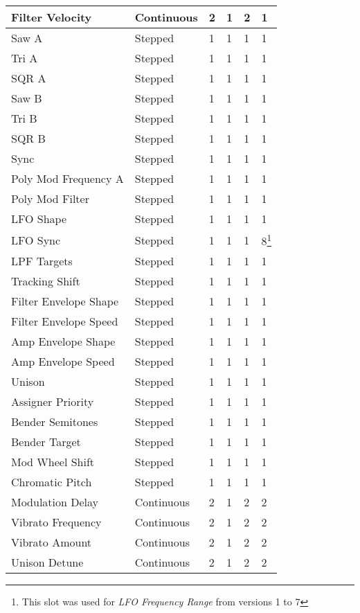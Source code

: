 \begin{longtable}[l]{|p{5cm}|p{2cm}|p{1.5cm}|p{1.5cm}|p{1.5cm}|p{1.5cm}|}
Filter Velocity & Continuous & 2 & 1 & 2 & 1 \\ \hline
Saw A & Stepped & 1 & 1 & 1 & 1 \\ \hline
Tri A & Stepped & 1 & 1 & 1 & 1 \\ \hline
SQR A & Stepped & 1 & 1 & 1 & 1 \\ \hline
Saw B & Stepped & 1 & 1 & 1 & 1 \\ \hline
Tri B & Stepped & 1 & 1 & 1 & 1 \\ \hline
SQR B & Stepped & 1 & 1 & 1 & 1 \\ \hline
Sync & Stepped & 1 & 1 & 1 & 1 \\ \hline
Poly Mod Frequency A & Stepped & 1 & 1 & 1 & 1 \\ \hline
Poly Mod Filter & Stepped & 1 & 1 & 1 & 1 \\ \hline
LFO Shape & Stepped & 1 & 1 & 1 & 1 \\ \hline
LFO Sync & Stepped & 1 & 1 & 1 & 8\footnote{This slot was used for \textit{LFO Frequency Range} from versions 1 to 7} \\ \hline
LPF Targets & Stepped & 1 & 1 & 1 & 1 \\ \hline
Tracking Shift & Stepped & 1 & 1 & 1 & 1 \\ \hline
Filter Envelope Shape & Stepped & 1 & 1 & 1 & 1 \\ \hline
Filter Envelope Speed & Stepped & 1 & 1 & 1 & 1 \\ \hline
Amp Envelope Shape & Stepped & 1 & 1 & 1 & 1 \\ \hline
Amp Envelope Speed & Stepped & 1 & 1 & 1 & 1 \\ \hline
Unison & Stepped & 1 & 1 & 1 & 1 \\ \hline
Assigner Priority & Stepped & 1 & 1 & 1 & 1 \\ \hline
Bender Semitones & Stepped & 1 & 1 & 1 & 1 \\ \hline
Bender Target & Stepped & 1 & 1 & 1 & 1 \\ \hline
Mod Wheel Shift & Stepped & 1 & 1 & 1 & 1 \\ \hline
Chromatic Pitch & Stepped & 1 & 1 & 1 & 1 \\ \hline
Modulation Delay & Continuous & 2 & 1 & 2 & 2 \\ \hline
Vibrato Frequency & Continuous & 2 & 1 & 2 & 2 \\ \hline
Vibrato Amount & Continuous & 2 & 1 & 2 & 2 \\ \hline
Unison Detune & Continuous & 2 & 1 & 2 & 2 \\ \hline

\end{longtable}
